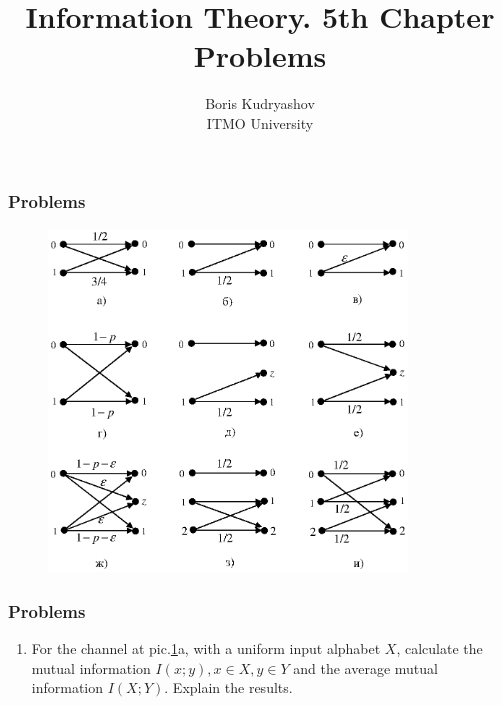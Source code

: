 \documentclass[14pt]{beamer}
\title{\small{Information Theory. 5th Chapter Problems}}
\author{\huge{
Boris Kudryashov \\
\vspace{30pt}
ITMO University
}}
\begin{document}
\maketitle

  

\begin{frame}
\frametitle{Problems}
\begin{enumerate}
  
    \begin{figure}[ht]
    \begin{minipage}{1.0\linewidth}
    \includegraphics[width=0.85\textwidth]{chann_ex.eps}
    \label{chan_ex}
    \end{minipage}
    \end{figure}
    
\end{enumerate}
\end{frame}    
    
\begin{frame}
\frametitle{Problems}
\begin{enumerate}
    \item[1]
    For the channel at pic.\ref{chan_ex}a, with a uniform input alphabet $X$, calculate the mutual information $I\left( {x;y} \right),x \in X,y \in Y$ and the average mutual information $I\left( {X;Y} \right)$. Explain the results.
    
\end{enumerate}
\end{frame}    
    
\end{document}
